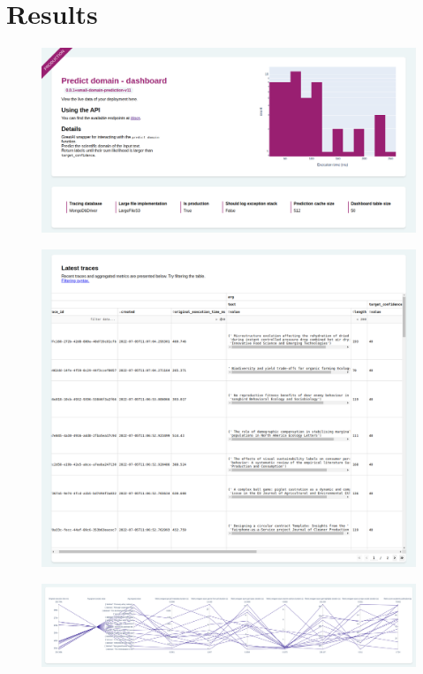 \section{Results}



\begin{figure}
    \centering
    \includegraphics[width=0.9\linewidth]{figures/greatai-header.png}
    \caption{}
    \label{fig:greatai-header}
\end{figure}

\begin{figure}
    \centering
    \includegraphics[width=1\textwidth]{figures/greatai-table.png}
    \caption{}
    \label{fig:greatai-table}
\end{figure}

\begin{figure}
    \centering
    \includegraphics[width=1\textwidth]{figures/greatai-parallel.png}
    \caption{}
    \label{fig:greatai-parallel}
\end{figure}


